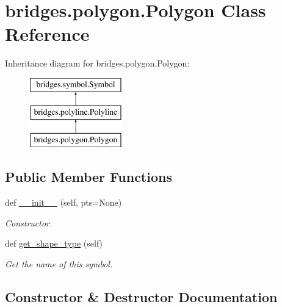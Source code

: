 \hypertarget{classbridges_1_1polygon_1_1_polygon}{}\section{bridges.\+polygon.\+Polygon Class Reference}
\label{classbridges_1_1polygon_1_1_polygon}
Inheritance diagram for bridges.\+polygon.\+Polygon\+:\begin{figure}[H]
\begin{center}
\leavevmode
\includegraphics[height=3.000000cm]{classbridges_1_1polygon_1_1_polygon}
\end{center}
\end{figure}
\subsection*{Public Member Functions}
\begin{DoxyCompactItemize}
\item 
def \hyperlink{classbridges_1_1polygon_1_1_polygon_a6e2515889df5d8626a32de2d4b36abc1}{\+\_\+\+\_\+init\+\_\+\+\_\+} (self, pts=None)
\begin{DoxyCompactList}\small\item\em Constructor. \end{DoxyCompactList}\item 
def \hyperlink{classbridges_1_1polygon_1_1_polygon_a4cf9417dcf182e095dc9da63db5356b4}{get\+\_\+shape\+\_\+type} (self)
\begin{DoxyCompactList}\small\item\em Get the name of this symbol. \end{DoxyCompactList}\end{DoxyCompactItemize}


\subsection{Constructor \& Destructor Documentation}
\mbox{\label{classbridges_1_1polygon_1_1_polygon_a6e2515889df5d8626a32de2d4b36abc1}} 
